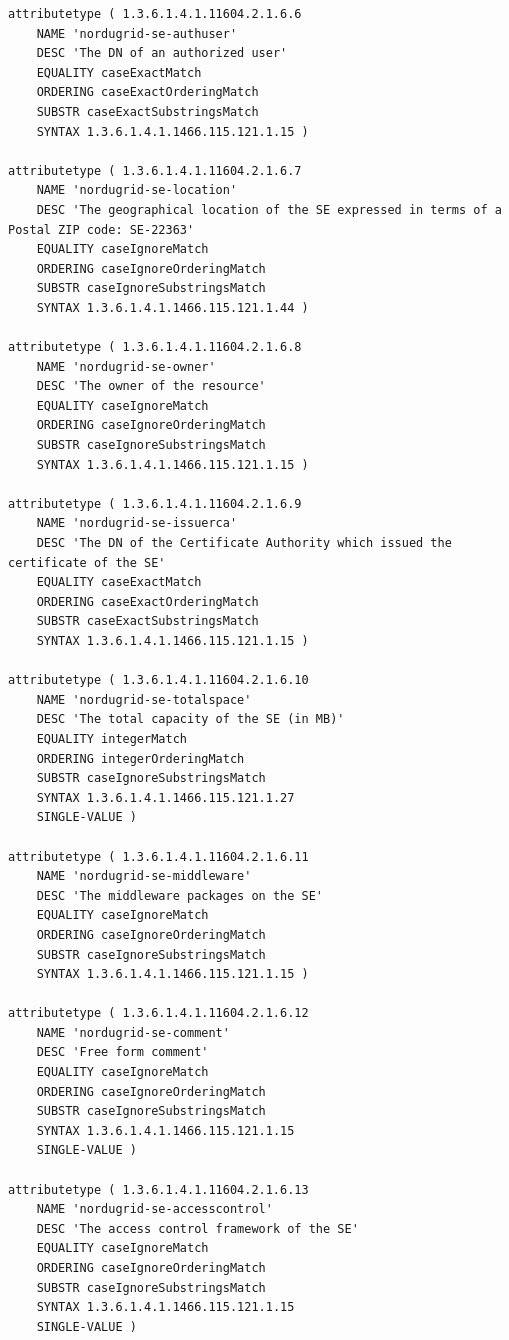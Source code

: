 \documentclass{article}
\begin{document}
\begin{verbatim}
attributetype ( 1.3.6.1.4.1.11604.2.1.6.6
    NAME 'nordugrid-se-authuser'
    DESC 'The DN of an authorized user'
    EQUALITY caseExactMatch
    ORDERING caseExactOrderingMatch
    SUBSTR caseExactSubstringsMatch
    SYNTAX 1.3.6.1.4.1.1466.115.121.1.15 )

attributetype ( 1.3.6.1.4.1.11604.2.1.6.7
    NAME 'nordugrid-se-location'
    DESC 'The geographical location of the SE expressed in terms of a Postal ZIP code: SE-22363'
    EQUALITY caseIgnoreMatch
    ORDERING caseIgnoreOrderingMatch
    SUBSTR caseIgnoreSubstringsMatch
    SYNTAX 1.3.6.1.4.1.1466.115.121.1.44 )
    
attributetype ( 1.3.6.1.4.1.11604.2.1.6.8
    NAME 'nordugrid-se-owner'
    DESC 'The owner of the resource'
    EQUALITY caseIgnoreMatch
    ORDERING caseIgnoreOrderingMatch
    SUBSTR caseIgnoreSubstringsMatch
    SYNTAX 1.3.6.1.4.1.1466.115.121.1.15 )
        
attributetype ( 1.3.6.1.4.1.11604.2.1.6.9
    NAME 'nordugrid-se-issuerca'
    DESC 'The DN of the Certificate Authority which issued the certificate of the SE'
    EQUALITY caseExactMatch
    ORDERING caseExactOrderingMatch
    SUBSTR caseExactSubstringsMatch
    SYNTAX 1.3.6.1.4.1.1466.115.121.1.15 )  
       
attributetype ( 1.3.6.1.4.1.11604.2.1.6.10
    NAME 'nordugrid-se-totalspace'
    DESC 'The total capacity of the SE (in MB)'
    EQUALITY integerMatch
    ORDERING integerOrderingMatch
    SUBSTR caseIgnoreSubstringsMatch
    SYNTAX 1.3.6.1.4.1.1466.115.121.1.27
    SINGLE-VALUE )

attributetype ( 1.3.6.1.4.1.11604.2.1.6.11
    NAME 'nordugrid-se-middleware'
    DESC 'The middleware packages on the SE'
    EQUALITY caseIgnoreMatch
    ORDERING caseIgnoreOrderingMatch
    SUBSTR caseIgnoreSubstringsMatch
    SYNTAX 1.3.6.1.4.1.1466.115.121.1.15 )

attributetype ( 1.3.6.1.4.1.11604.2.1.6.12
    NAME 'nordugrid-se-comment'
    DESC 'Free form comment'
    EQUALITY caseIgnoreMatch
    ORDERING caseIgnoreOrderingMatch
    SUBSTR caseIgnoreSubstringsMatch
    SYNTAX 1.3.6.1.4.1.1466.115.121.1.15
    SINGLE-VALUE )    

attributetype ( 1.3.6.1.4.1.11604.2.1.6.13
    NAME 'nordugrid-se-accesscontrol'
    DESC 'The access control framework of the SE'
    EQUALITY caseIgnoreMatch
    ORDERING caseIgnoreOrderingMatch
    SUBSTR caseIgnoreSubstringsMatch
    SYNTAX 1.3.6.1.4.1.1466.115.121.1.15 
    SINGLE-VALUE )


\end{verbatim}
\end{document}
